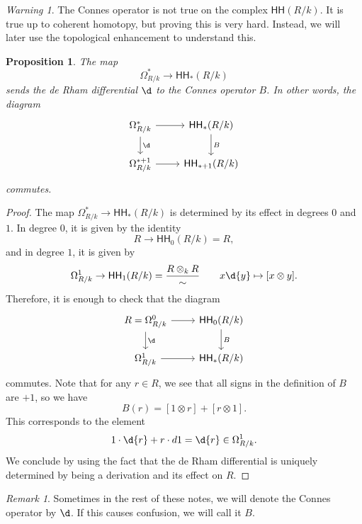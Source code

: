 \documentclass[10pt, oneside]{memoir}
\newtheorem{prop}[thm]{Proposition}
\theoremstyle{definition}
\theoremstyle{remark}
\newtheorem{rmk}[thm]{Remark}
\newtheorem{warn}[thm]{Warning}
\theoremstyle{plain}
\theoremstyle{definition}
\theoremstyle{remark}
\newcommand{\ms}[1]{\mathsf{#1}}
\newcommand{\1}{\mathbf{1}}
\newcommand{\2}{\mathbf{2}}
\newcommand{\3}{\mathbf{3}}
\newcommand{\HH}{\ms{HH}}
\begin{document}
\begin{warn}
    The Connes operator is not true on the complex \(\HH(R/k) \). It is true up to coherent homotopy, but proving this is very hard. Instead, we will later use the topological enhancement to understand this.
\end{warn}

\begin{prop}
    The map 
    \[ \Omega^*_{R/k} \to \HH_*(R/k) \]
    sends the de Rham differential \(\d \) to the Connes operator \(B \). In other words, the diagram
    \begin{equation*}
    \begin{tikzcd}
        \Omega^*_{R/k} \ar{r} \ar{d}{\d} & \HH_*(R/k) \ar{d}{B} \\
        \Omega^{*+1}_{R/k} \ar{r} & \HH_{*+1}(R/k)
    \end{tikzcd}
    \end{equation*}
    commutes.
\end{prop}

\begin{proof}
    The map \(\Omega^*_{R/k} \to \HH_*(R/k) \) is determined by its effect in degrees \(0 \) and \(1 \). In degree \(0 \), it is given by the identity
    \[ R \to \HH_0(R/k) = R, \]
    and in degree \(1 \), it is given by
    \[ \Omega^1_{R/k} \to \HH_1(R/k) = \frac{R \otimes_k R}{\sim} \qquad x \d{y} \mapsto [x \otimes y]. \]
    Therefore, it is enough to check that the diagram
    \begin{equation*}
    \begin{tikzcd}
        R = \Omega^0_{R/k} \ar{r} \ar{d}{\d} & \HH_0(R/k) \ar{d}{B} \\
        \Omega^1_{R/k} \ar{r} & \HH_*(R/k)
    \end{tikzcd}
    \end{equation*}
    commutes. Note that for any \(r \in R \), we see that all signs in the definition of \(B \) are \(+1 \), so we have
    \[ B(r) = [1 \otimes r] + [r \otimes 1]. \]
    This corresponds to the element
    \[ 1 \cdot \d{r} + r \cdot d{1} = \d{r} \in \Omega^1_{R/k}. \]
    We conclude by using the fact that the de Rham differential is uniquely determined by being a derivation and its effect on \(R \).
\end{proof}

\begin{rmk}
    Sometimes in the rest of these notes, we will denote the Connes operator by \(\d \). If this causes confusion, we will call it \(B \).
\end{rmk}
\end{document}
